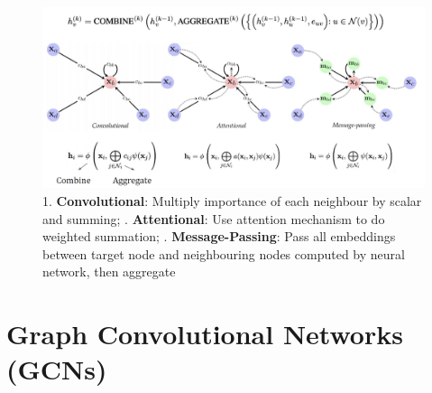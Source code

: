 \begin{figure}[h!t]
    \centering
    \includegraphics[width=1\linewidth]{gnnmodels.png}
    \caption{1.\textbf{ Convolutional}: Multiply importance of each neighbour by scalar and summing; . \textbf{Attentional}: Use attention mechanism to do weighted summation; 
    . \textbf{Message-Passing}: Pass all embeddings between target node and neighbouring nodes computed by neural network, then aggregate}
    \label{fig:enter-label}
\end{figure}

\section{Graph Convolutional Networks (GCNs)}

